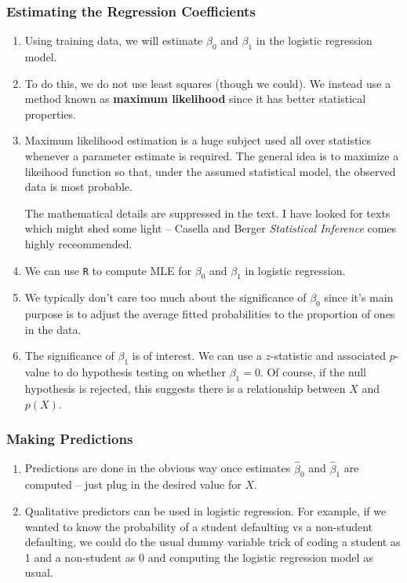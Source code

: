 \documentclass[10pt]{article}
\begin{document}
\subsubsection{Estimating the Regression Coefficients} 
\begin{enumerate}
	\item Using training data, we will estimate $\beta_0$ and $\beta_1$ in the logistic regression model.  
	\item To do this, we do not use least squares (though we could).  We instead use a method known as \textbf{maximum likelihood} since it has better statistical properties.
	\item {\color{brown} Maximum likelihood estimation is a huge subject used all over statistics whenever a parameter estimate is required.  The general idea is to maximize a likeihood function so that, under the assumed statistical model, the observed data is most probable. 
	
	The mathematical details are suppressed in the text.  I have looked for texts which might shed some light -- Casella and Berger {\it{Statistical Inference}} comes highly receommended.}
	\item We can use {\tt R} to compute MLE for $\beta_0$ and $\beta_1$ in logistic regression.
	\item We typically don't care too much about the significance of $\beta_0$ since it's main purpose is to adjust the average fitted probabilities to the proportion of ones in the data.
	\item The significance of $\beta_1$ is of interest.  We can use a $z$-statistic and associated $p$-value to do hypothesis testing on whether $\beta_1 = 0$.  Of course, if the null hypothesis is rejected, this suggests there is a relationship between $X$ and $p(X)$.  	
\end{enumerate}
\subsubsection{Making Predictions} 
\begin{enumerate}
	\item Predictions are done in the obvious way once estimates $\hat \beta_0$ and $\hat \beta_1$ are computed -- just plug in the desired value for $X$.  
	\item Qualitative predictors can be used in logistic regression.  For example, if we wanted to know the probability of a student defaulting vs a non-student defaulting, we could do the usual dummy variable trick of coding a student as 1 and a non-student as 0 and computing the logistic regression model as usual.
\end{enumerate}
\end{document}

